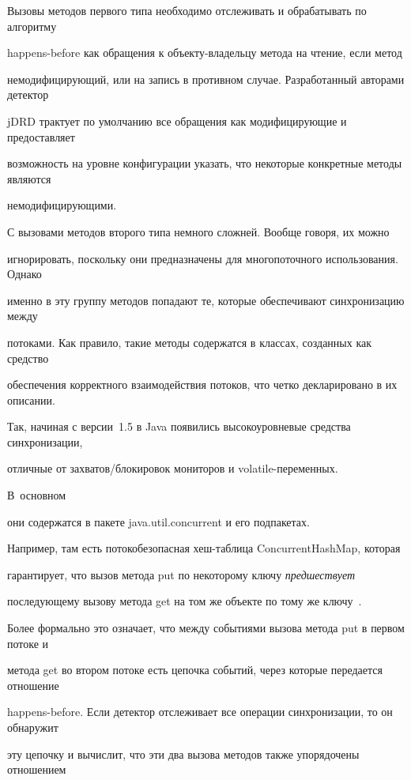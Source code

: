   Вызовы методов первого типа необходимо отслеживать и обрабатывать по алгоритму

happens-before как обращения к объ\-ек\-ту-вла\-дель\-цу метода на чтение, если метод

немодифицирующий, или на запись в противном случае. Разработанный авторами детектор

jDRD трактует по умолчанию все обращения как модифицирующие и предоставляет

возможность на уровне конфигурации указать, что некоторые конкретные методы являются

немодифицирующими.



  С вызовами методов второго типа немного сложней. Вообще говоря, их можно

игнорировать, поскольку они предназначены для многопоточного использования. Однако

именно в эту группу методов попадают те, которые обеспечивают синхронизацию между

потоками. Как правило, такие методы содержатся в классах, созданных как средство

обеспечения корректного взаимодействия потоков, что четко декларировано в их описании.

Так, начиная с версии~1.5 в Java появились высокоуровневые средства синхронизации,

отличные от за\-хва\-тов/бло\-ки\-ро\-вок мониторов и volatile-пе\-ре\-мен\-ных.

В~основном

они содержатся в пакете {\sf java.util.concurrent} и его подпакетах.

  Например, там есть потокобезопасная хеш-таб\-ли\-ца {\sf ConcurrentHashMap}, которая

гарантирует, что вызов метода {\sf put} по некоторому ключу \textit{предшествует}

последующему вызову метода {\sf get} на том же объекте по тому же ключу~\cite{18-ts}.



  Более формально это означает, что между событиями вызова метода put в первом потоке и

метода get во втором потоке есть цепочка событий, через которые передается отношение

happens-before. Если детектор отслеживает все операции синхронизации, то он обнаружит

эту цепочку и вычислит, что эти два вызова методов также упорядочены отношением

